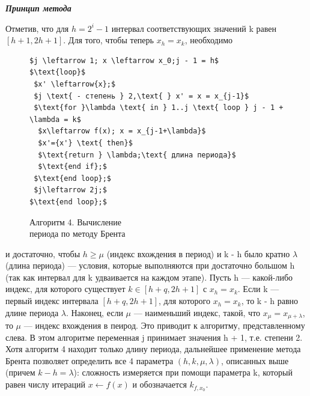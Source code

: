 \documentclass{../template/mai_book}
\begin{document}
\slshape{\textbf{Принцип метода}} \par
{} \par
\begin{figure}[h]
\end{figure}%
Отметив, что для $h = 2^{i} - 1$ интервал соответствующих значений k равен $[h + 1, 2h + 1]$. Для того, чтобы теперь $x_{h} = x_{k}$, необходимо
\begin{figure}
\begin{lstlisting}[mathescape=true]
$j \leftarrow 1; x \leftarrow x_0;j - 1 = h$
$\text{loop}$
 $x' \leftarrow{x};$
 $j \text{ - степень } 2,\text{ } x' = x = x_{j-1}$
 $\text{for }\lambda \text{ in } 1..j \text{ loop } j - 1 + \lambda = k$
  $x\leftarrow f(x); x = x_{j-1+\lambda}$
  $x'={x'} \text{ then}$
  $\text{return } \lambda;\text{ длина периода}$
  $\text{end if};$
 $\text{end loop};$
 $j\leftarrow 2j;$
$\text{end loop};$
\end{lstlisting}
Алгоритм 4. Вычисление\\
периода по методу Брента
\end{figure}
 и достаточно, чтобы $h \geqslant \mu$ (индекс вхождения в период) и k - h было  кратно $\lambda$ (длина периода) --- условия, которые выполняются при достаточно большом h (так как интервал для k удваивается на каждом этапе). Пусть h --- какой-либо индекс, для которого существует  $k \in [h + q, 2h + 1]$ с $x_{h} = x_{k}$. Если k --- первый индекс интервала $[h + q, 2h + 1]$, для которого $x_{h} = x_{k}$, то k - h равно длине периода $\lambda$. Наконец, если $\mu$ --- наименьший индекс, такой, что $x_{\mu} = x_{\mu + \lambda}$, то $\mu$ --- индекс вхождения в пеирод. Это приводит к алгоритму, представленному слева. В этом алгоритме переменная j принимает значения h + 1, т.е. степени 2. Хотя алгоритм 4 находит только длину периода, дальнейшее применение метода Брента позволяет определить все 4 параметра $(h, k, \mu, \lambda)$, описанных выше (причем $k - h = \lambda$): сложность измеряется при помощи параметра k, который равен числу итераций $x \leftarrow f(x)$ и обозначается $k_{f,x_{0}}$. \par 
\end{document}
